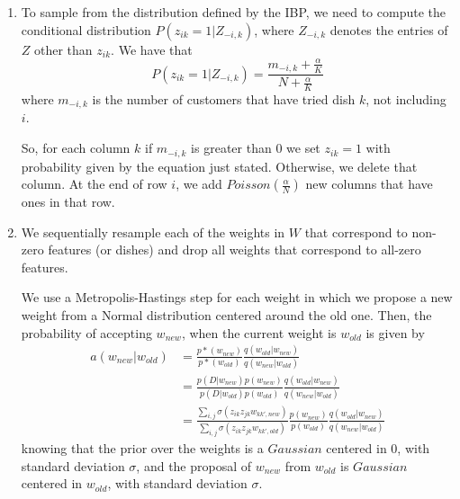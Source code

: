 \documentclass[]{article}
\begin{document}
\begin{enumerate}
	\item To sample from the distribution defined by the IBP, we need to compute the conditional distribution $P(z_{ik}=1|Z_{-i,k})$, where $Z_{-i,k}$ denotes the entries of $Z$ other than $z_{ik}$. We have that
	$$
	P(z_{ik}=1|Z_{-i,k}) = \frac{m_{-i,k}+\frac{\alpha}{K}}{N+\frac{\alpha}{K}}
	$$
	where $m_{-i,k}$ is the number of customers that have tried dish $k$, not including $i$.
	
	So, for each column $k$ if $m_{-i,k}$  is greater than 0 we set $z_{ik}=1$ with probability given by the equation just stated. Otherwise, we delete that column. At the end of row $i$, we add $Poisson(\frac{\alpha}{N})$ new columns that have ones in that row. 
	\item We sequentially resample each of the weights in $W$ that correspond to non-zero features (or dishes) and drop all weights that correspond to all-zero features. 
	
	We use a Metropolis-Hastings step for each weight in which we propose a new weight from a Normal distribution centered around the old one. Then, the probability of accepting $w_{new}$, when the current weight is $w_{old}$ is given by
	\begin{align*}
		a(w_{new}|w_{old}) & = \frac{p*(w_{new})}{p*(w_{old})} \frac{q(w_{old}|w_{new})}{q(w_{new}|w_{old})} \\
		& = \frac{p(D|w_{new})p(w_{new})}{p(D|w_{old})p(w_{old})} \frac{q(w_{old}|w_{new})}{q(w_{new}|w_{old})} \\
		& = \frac{\sum_{i,j}\sigma(z_{ik}z_{jk}w_{kk',new})}{\sum_{i,j}\sigma(z_{ik}z_{jk}w_{kk',old})}\frac{p(w_{new})}{p(w_{old})}\frac{q(w_{old}|w_{new})}{q(w_{new}|w_{old})}
	\end{align*}
	knowing that the prior over the weights is a $Gaussian$ centered in 0, with standard deviation $\sigma$, and the proposal of $w_{new}$ from $w_{old}$ is  $Gaussian$ centered in $w_{old}$, with standard deviation $\sigma$.
 \end{enumerate}
\end{document}

